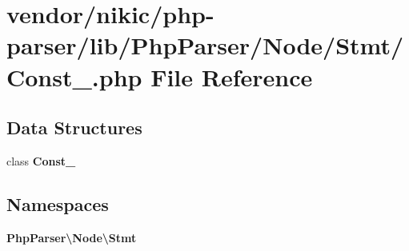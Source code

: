 \section{vendor/nikic/php-\/parser/lib/\+Php\+Parser/\+Node/\+Stmt/\+Const\+\_\+.php File Reference}
\label{_stmt_2_const___8php}
\subsection*{Data Structures}
\begin{DoxyCompactItemize}
\item 
class {\bf Const\+\_\+}
\end{DoxyCompactItemize}
\subsection*{Namespaces}
\begin{DoxyCompactItemize}
\item 
 {\bf Php\+Parser\textbackslash{}\+Node\textbackslash{}\+Stmt}
\end{DoxyCompactItemize}

